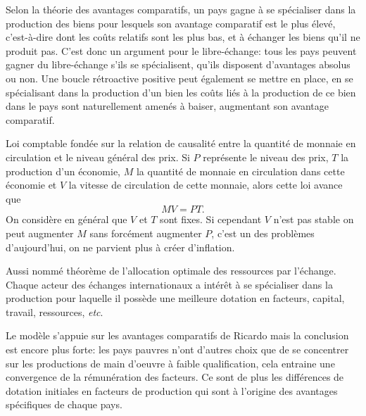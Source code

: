\documentclass[main.tex]{subfiles}
\begin{document}
        \begin{definition}
                Selon la théorie des avantages comparatifs, un pays gagne à se spécialiser dans la production des biens pour lesquels son avantage comparatif est le plus élevé, c'est-à-dire dont les coûts relatifs sont les plus bas, et à échanger les biens qu'il ne produit pas. C’est donc un argument pour le libre-échange: tous les pays peuvent gagner du libre-échange s’ils se spécialisent, qu'ils disposent d'avantages absolus ou non. Une boucle rétroactive positive peut également se mettre en place, en se spécialisant dans la production d'un bien les coûts liés à la production de ce bien dans le pays sont naturellement amenés à baiser, augmentant son avantage comparatif.
        \end{definition}

        \begin{definition}
                Loi comptable fondée sur la relation de causalité entre la quantité de monnaie en circulation et le niveau général des prix. 
                Si $P$ représente le niveau des prix, $T$ la production d'un économie, $M$ la quantité de monnaie en circulation dans cette économie et $V$ la vitesse de circulation de cette monnaie, alors cette loi avance que
                \[
                MV = PT
                .\] On considère en général que $V$ et $T$ sont fixes. Si cependant $V$ n'est pas stable on peut augmenter $M$ sans forcément augmenter $P$, c'est un des problèmes d'aujourd'hui, on ne parvient plus à créer d'inflation. 
        \end{definition}

        \begin{theorem}
                         Aussi nommé théorème de l'allocation optimale des ressources par l'échange.
                         Chaque acteur des échanges internationaux a intérêt à se spécialiser dans la production pour laquelle il possède une meilleure dotation en facteurs, capital, travail, ressources, \textit{etc}. 
                 \end{theorem}
        Le modèle s'appuie sur les avantages comparatifs de Ricardo mais la conclusion est encore plus forte: les pays pauvres n'ont d'autres choix que de se concentrer sur les productions de main d'oeuvre à faible qualification, cela entraine une convergence de la rémunération des facteurs. 
                         Ce sont de plus les différences de dotation initiales en facteurs de production qui sont à l'origine des avantages spécifiques de chaque pays. \\
\end{document}

